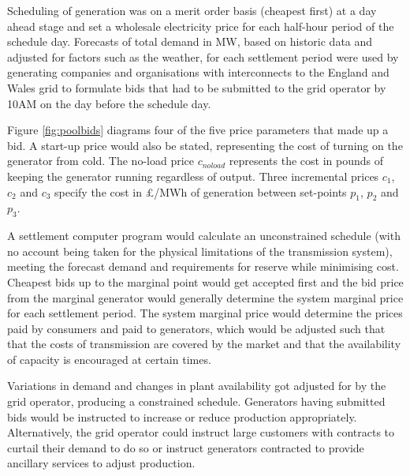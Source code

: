 Scheduling of generation was on a merit order basis (cheapest first) at a day
ahead stage and set a wholesale electricity price for each half-hour period of
the schedule day.  Forecasts of total demand in MW, based on historic data and
adjusted for factors such as the weather, for each settlement period were used
by generating companies and organisations with interconnects to the England
and Wales grid to formulate bids that had to be submitted to the grid operator
by 10AM on the day before the schedule day.



Figure \ref{fig:poolbids} diagrams four of the five price parameters
that made up a bid.  A start-up price would also be stated, representing the
cost of turning on the generator from cold.  The no-load price $c_{noload}$
represents the cost in pounds of keeping the generator running regardless of output. Three
incremental prices $c_1$, $c_2$ and $c_3$ specify the cost in \pounds/MWh of
generation between set-points $p_1$, $p_2$ and $p_3$.

A settlement computer program would calculate an unconstrained schedule
(with no account being taken for the physical limitations of the transmission
system), meeting the forecast demand and requirements for reserve while minimising cost.
Cheapest bids up to the marginal point would get accepted first and the bid
price from the marginal generator would generally determine the system marginal
price for each settlement period.  The system marginal price would determine
the prices paid by consumers and paid to generators, which would be adjusted
such that that the costs of transmission are covered by the market and that the
availability of capacity is encouraged at certain times.

Variations in demand and changes in plant availability got adjusted for by
the grid operator, producing a constrained schedule.  Generators having
submitted bids would be instructed to increase or reduce production
appropriately.  Alternatively, the grid operator could instruct large customers
with contracts to curtail their demand to do so or instruct generators
contracted to provide ancillary services to adjust production.

